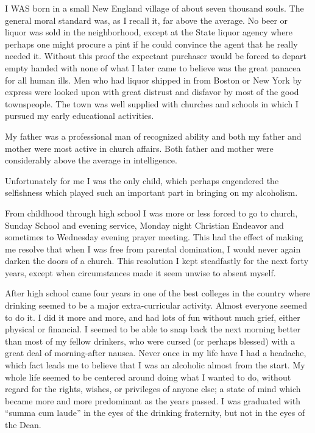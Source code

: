 \begin{biblechapter}
    I WAS born in a small New England village 
    of about seven thousand souls.
\verse The general moral standard was, as I recall it, 
    far above the average.
\verse No beer or liquor was sold in the neighborhood, 
    except at the State liquor agency 
    where perhaps one might procure a pint 
    if he could convince the agent that he really needed it.
\verse Without this proof 
    the expectant purchaser would be forced to depart 
    empty handed with none of what I later came to believe 
    was the great panacea for all human ills.
\verse Men who had liquor shipped in 
    from Boston or New York by express 
    were looked upon with great distrust and disfavor 
    by most of the good townspeople.
\verse The town was well supplied with churches and schools 
    in which I pursued my early educational activities.

\verse My father was a professional man of recognized ability and both my father and mother were most active in church affairs. Both father and mother were considerably above the average in intelligence.

Unfortunately for me I was the only child, which perhaps engendered the selfishness which played such an important part in bringing on my alcoholism.

From childhood through high school I was more or less forced to go to church, Sunday School and evening service, Monday night Christian Endeavor and sometimes to Wednesday evening prayer meeting. This had the effect of making me resolve that when I was free from parental domination, I would never again darken the doors of a church. This resolution I kept steadfastly for the next forty years, except when circumstances made it seem unwise to absent myself.

After high school came four years in one of the best colleges in the country where drinking seemed to be a major extra-curricular activity. Almost everyone seemed to do it. I did it more and more, and had lots of fun without much grief, either physical or financial. I seemed to be able to snap back the next morning better than most of my fellow drinkers, who were cursed (or perhaps blessed) with a great deal of morning-after nausea. Never once in my life have I had a headache, which fact leads me to believe that I was an alcoholic almost from the start. My whole life seemed to be centered around doing what I wanted to do, without regard for the rights, wishes, or privileges of anyone else; a state of mind which became more and more predominant as the years passed. I was graduated with “summa cum laude” in the eyes of the drinking fraternity, but not in the eyes of the Dean.


\end{biblechapter}
